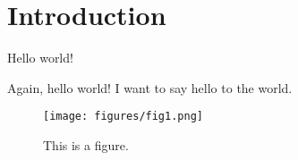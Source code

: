 \chapter{Introduction}

Hello world!

Again, hello world!
I want to say hello to the world.

\begin{figure}[h]
\centering
\texttt{[image: figures/fig1.png]}
\caption{This is a figure.}
\label{fig:fig1}
\end{figure}

\begin{table}
\centering  

\end{table}